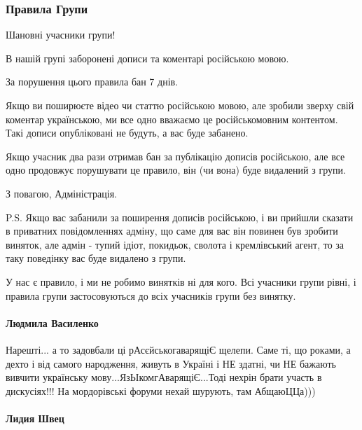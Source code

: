  
 
 

\subsubsection{Правила Групи}

Шановні учасники групи!

В нашій групі заборонені дописи та коментарі російською мовою.

За порушення цього правила бан 7 днів. 

Якщо ви поширюєте відео чи статтю російською мовою, але зробили зверху свій
коментар українською, ми все одно вважаємо це російськомовним контентом. Такі
дописи опубліковані не будуть, а вас буде забанено.

Якщо учасник два рази отримав бан за публікацію дописів російською, але все
одно продовжує порушувати це правило, він (чи вона) буде видалений з групи.

З повагою,
Адміністрація.

P.S. Якщо вас забанили за поширення дописів російською, і ви прийшли сказати в
приватних повідомленнях адміну, що саме для вас він повинен був зробити
виняток, але адмін - тупий ідіот, покидьок, сволота і кремлівський агент, то за
таку поведінку вас буде видалено з групи. 

У нас є правило, і ми не робимо винятків ні для кого. Всі учасники групи рівні,
і правила групи застосовуються до всіх учасників групи без винятку.

\paragraph{Людмила Василенко}

Нарешті... а то задовбали ці рАсєйськогаварящіЄ щелепи. Саме ті, що роками, а
дехто і від самого народження, живуть в Україні і НЕ здатні, чи НЕ бажають
вивчити українську мову...ЯзЬІкомгАварящіЄ...Тоді нехрін брати участь в
дискусіях!!! На мордорівські форуми нехай шурують, там АбщаюЦЦа)))

\paragraph{Лидия Швец}

